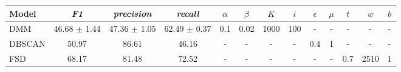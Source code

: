 \begin{tabular}{|l|cccccccccccc|}
\hline
\textbf{Model} &       \textit{F1} & \textit{precision} &   \textit{recall} & $\alpha$ & $\beta$ &   $K$ &  $i$ & $\epsilon$ & $\mu$ &  $t$ &   $w$ & $b$ \\
\hline
           DMM &  46.68 $\pm$ 1.44 &   47.36 $\pm$ 1.05 &  62.49 $\pm$ 0.37 &      0.1 &    0.02 &  1000 &  100 &          - &     - &    - &     - &   - \\
        DBSCAN &             50.97 &              86.61 &             46.16 &        - &       - &     - &    - &        0.4 &     1 &    - &     - &   - \\
           FSD &             68.17 &              81.48 &             72.52 &        - &       - &     - &    - &          - &     - &  0.7 &  2510 &   1 \\
\hline
\end{tabular}
